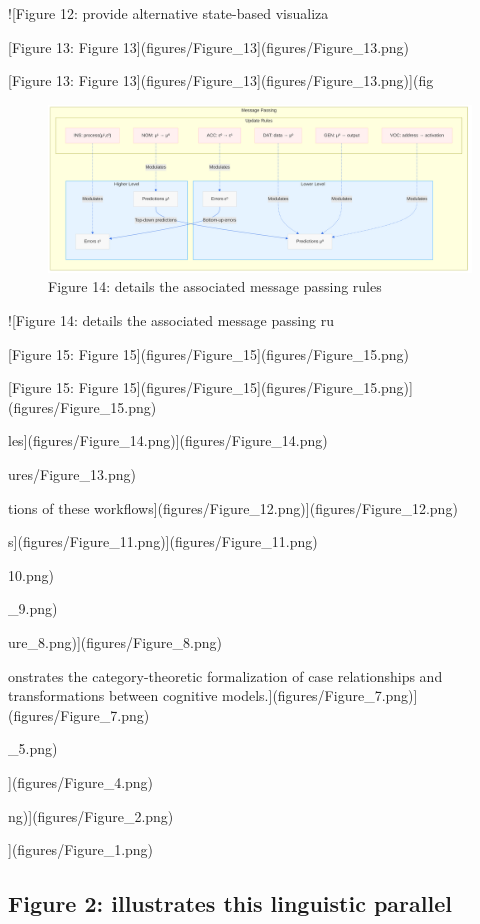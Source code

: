 \documentclass[
  11pt,
  letterpaper,
]{article}
\begin{document}
!{[}Figure 12: provide alternative state-based visualiza

{[}Figure 13: Figure 13{]}(figures/Figure\_13{]}(figures/Figure\_13.png)

{[}Figure 13: Figure
13{]}(figures/Figure\_13{]}(figures/Figure\_13.png){]}(fig

\begin{figure}
\centering
\includegraphics{figures/Figure_14.png}
\caption{Figure 14: details the associated message passing rules}
\end{figure}

!{[}Figure 14: details the associated message passing ru

{[}Figure 15: Figure 15{]}(figures/Figure\_15{]}(figures/Figure\_15.png)

{[}Figure 15: Figure
15{]}(figures/Figure\_15{]}(figures/Figure\_15.png){]}(figures/Figure\_15.png)

les{]}(figures/Figure\_14.png){]}(figures/Figure\_14.png)

ures/Figure\_13.png)

tions of these
workflows{]}(figures/Figure\_12.png){]}(figures/Figure\_12.png)

s{]}(figures/Figure\_11.png){]}(figures/Figure\_11.png)

10.png)

\_9.png)

ure\_8.png){]}(figures/Figure\_8.png)

onstrates the category-theoretic formalization of case relationships and
transformations between cognitive
models.{]}(figures/Figure\_7.png){]}(figures/Figure\_7.png)

\_5.png)

{]}(figures/Figure\_4.png)

ng){]}(figures/Figure\_2.png)

{]}(figures/Figure\_1.png)

\pagebreak

\hypertarget{figure-2-illustrates-this-linguistic-parallel}{%
\subsection{Figure 2: illustrates this linguistic
parallel}\label{figure-2-illustrates-this-linguistic-parallel}}
\end{document}

